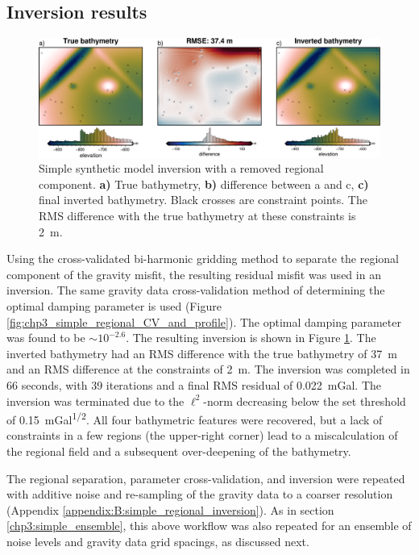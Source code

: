 \subsection{Inversion results}

\begin{figure}[!ht]
    \centering
    \includegraphics[width=.95\textwidth]{figures/chp3/chp3_simple_regional_results.png}
    \caption[Synthetic inversion with regional component results]{Simple synthetic model inversion with a removed regional component. \textbf{a)} True bathymetry, \textbf{b)} difference between a and c, \textbf{c)} final inverted bathymetry. Black crosses are constraint points. The RMS difference with the true bathymetry at these constraints is 2~m.}
    \label{fig:chp3_simple_regional_results}
\end{figure}

Using the cross-validated bi-harmonic gridding method to separate the regional component of the gravity misfit, the resulting residual misfit was used in an inversion. The same gravity data cross-validation method of determining the optimal damping parameter is used (Figure \ref{fig:chp3_simple_regional_CV_and_profile}). The optimal damping parameter was found to be $\sim10^{-2.6}$. The resulting inversion is shown in Figure \ref{fig:chp3_simple_regional_results}. The inverted bathymetry had an RMS difference with the true bathymetry of 37~m and an RMS difference at the constraints of 2~m. The inversion was completed in 66 seconds, with 39 iterations and a final RMS residual of 0.022~mGal. The inversion was terminated due to the $\ell^2$-norm decreasing below the set threshold of 0.15~mGal\textsuperscript{1/2}. All four bathymetric features were recovered, but a lack of constraints in a few regions (the upper-right corner) lead to a miscalculation of the regional field and a subsequent over-deepening of the bathymetry. 

The regional separation, parameter cross-validation, and inversion were repeated with additive noise and re-sampling of the gravity data to a coarser resolution (Appendix \ref{appendix:B:simple_regional_inversion}). As in section \ref{chp3:simple_ensemble}, this above workflow was also repeated for an ensemble of noise levels and gravity data grid spacings, as discussed next. 

